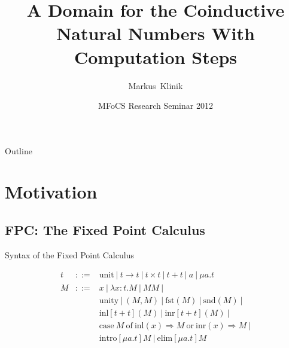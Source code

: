 \documentclass{beamer}
\title[Short Paper Title] %
{A Domain for the Coinductive Natural Numbers With Computation Steps}
\author[Klinikr] %
{Markus~Klinik}
\institute[Radboud University Nijmegen] %
{
  Radboud University Nijmegen
}
\date[2012] %
{MFoCS Research Seminar 2012}
\newcommand{\arr}{\rightarrow}
\newcommand{\Arr}{\Rightarrow}
\begin{document}
\begin{frame}
  \titlepage
\end{frame}

\begin{frame}{Outline}
  \tableofcontents
\end{frame}





\section{Motivation}

\subsection{FPC: The Fixed Point Calculus}


\begin{frame}{Syntax of the Fixed Point Calculus}

  \begin{eqnarray*}
  t & ::= & \text{unit}\ |\ t \arr t\ |\ t \times t\ |\ t + t\ |\ a\ |\ \mu a.t \\
  M & ::= & x\ |\ \lambda x : t . M \ |\ MM \ | \\
    &     & \text{unity}\ |\ (M, M)\ |\ \text{fst}(M)\ |\ \text{snd}(M)\ | \\
    &     & \text{inl}[t + t](M)\ |\ \text{inr}[t + t](M)\ | \\
    &     & \text{case}\ M\ \text{of}\ \text{inl}(x) \Arr M\ \text{or}\ \text{inr}(x) \Arr M\ | \\
    &     & \text{intro}[\mu a.t]M\ |\ \text{elim}[\mu a.t]M
  \end{eqnarray*}

\end{frame}
\end{document}
